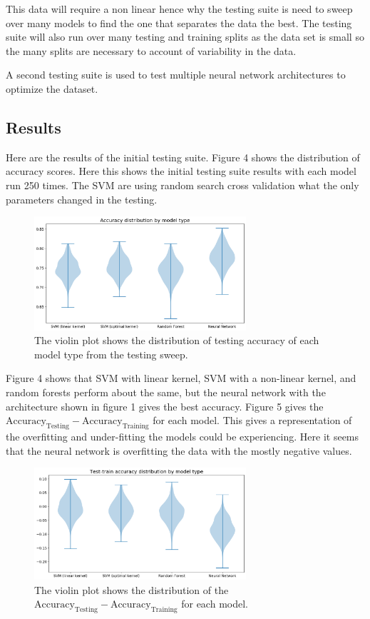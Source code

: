\documentclass[12pt]{article}
\begin{document}
This data will require a non linear hence why the testing suite is need to sweep over many models to find the one that separates the data the best.  The testing suite will also run over many testing and training splits as the data set is small so the many splits are necessary to account of variability in the data.  

A second testing suite is used to test multiple neural network architectures to optimize the dataset.  

\subsection{Results}

Here are the results of the initial testing suite. Figure 4 shows the distribution of accuracy scores.  Here this shows the initial testing suite results with each model run 250 times.  The SVM are using random search cross validation what the only parameters changed in the testing.  

 \begin{figure}[H]
 \centering
  \includegraphics[width=0.7\textwidth]{testOut}
  \caption{The violin plot shows the distribution of testing accuracy of each model type from the testing sweep.}
  \end{figure}
  
  Figure 4 shows that SVM with linear kernel, SVM with a non-linear kernel, and random forests perform about the same, but the neural network with the architecture shown in figure 1 gives the best accuracy. Figure 5 gives the  $\text{Accuracy}_{\text{Testing}} - \text{Accuracy}_{\text{Training}}$ for each model.  This gives a representation of the overfitting and under-fitting the models could be experiencing.  Here it seems that the neural network is overfitting the data with the mostly negative values.
 
   \begin{figure}[H]
 \centering
  \includegraphics[width=0.7\textwidth]{testOut2}
  \caption{The violin plot shows the distribution of the $\text{Accuracy}_{\text{Testing}} - \text{Accuracy}_{\text{Training}}$
for each model.  }
  \end{figure}
  
\end{document}
